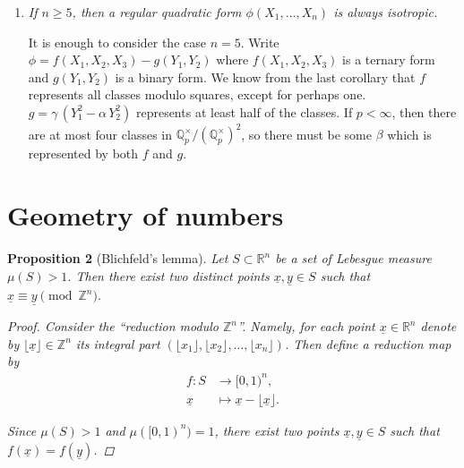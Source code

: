 \documentclass{article}
\newcommand{\ZZ}{\mathbb{Z}}
\newcommand{\QQ}{\mathbb{Q}}
\theoremstyle{myplain}
\newtheorem{proposition}{Proposition}[section]
\newtheorem{corollary}[proposition]{Corollary}
\theoremstyle{mydefinition}
\begin{document}
\begin{enumerate}
  \begin{corollary}
    A regular ternary form represents all classes in
    $\QQ_p^\times / (\QQ_p^\times)^2$, except for perhaps one.

    \begin{proof}
      Let $\phi (X_1,X_2,X_3)$ be a ternary form. It does not represent some
      $\alpha \in \QQ_p^\times$ iff $\phi (X_1,X_2,X_3) - \alpha\,Y^2$ is
      anisotropic. The latter requires that
      $\delta (\phi - \alpha\,Y^2) = -\alpha\,\delta (\phi)$ is a square. So the
      only class in $\QQ_p^\times / (\QQ_p^\times)^2$ that is probably not
      represented is the inverse of $-\delta (\phi)$.
    \end{proof}
\end{corollary}

\item \emph{If $n \ge 5$, then a regular quadratic form $\phi (X_1,\ldots,X_n)$
    is always isotropic.}

  It is enough to consider the case $n = 5$. Write
  $\phi = f (X_1,X_2,X_3) - g (Y_1,Y_2)$ where $f (X_1,X_2,X_3)$ is a ternary
  form and $g (Y_1,Y_2)$ is a binary form. We know from the last corollary that
  $f$ represents all classes modulo squares, except for perhaps one.
  $g = \gamma \, (Y_1^2 - \alpha\,Y_2^2)$ represents at least half of the
  classes. If $p < \infty$, then there are at most four classes in
  $\QQ_p^\times / (\QQ_p^\times)^2$, so there must be some $\beta$ which is
  represented by both $f$ and $g$.
\end{enumerate}

\section{Geometry of numbers}

\begin{proposition}[Blichfeld's lemma]
  Let $S \subset \mathbb{R}^n$ be a set of Lebesgue measure $\mu (S) > 1$. Then
  there exist two distinct points $\underline{x}, \underline{y} \in S$ such that
  $\underline{x} \equiv \underline{y} \pmod{\ZZ^n}$.

  \begin{proof}
    Consider the ``reduction modulo $\ZZ^n$''. Namely, for each point
    $\underline{x} \in \mathbb{R}^n$ denote by
    $\lfloor\underline{x}\rfloor \in \ZZ^n$ its integral part
    $(\lfloor x_1\rfloor, \lfloor x_2\rfloor, \ldots, \lfloor x_n\rfloor)$. Then
    define a reduction map by
    \begin{align*}
      f\colon S & \to [0,1)^n,\\
      \underline{x} & \mapsto \underline{x} - \lfloor \underline{x} \rfloor.
    \end{align*}

    Since $\mu (S) > 1$ and $\mu ([0,1)^n) = 1$, there exist two points
    $\underline{x}, \underline{y} \in S$ such that
    $f (\underline{x}) = f (\underline{y})$.
  \end{proof}
\end{proposition}
\end{document}
